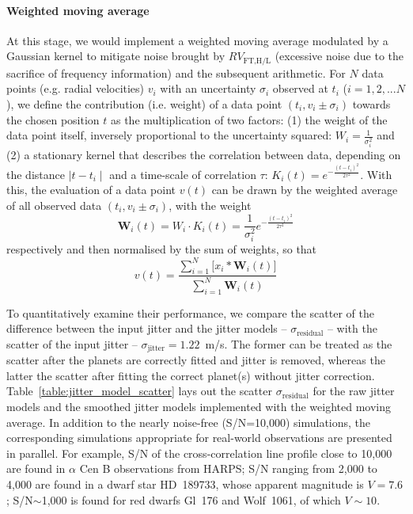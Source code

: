 \paragraph{Weighted moving average} At this stage, we would implement a weighted moving average modulated by a Gaussian kernel to mitigate noise brought by $RV_\text{FT,H/L}$ (excessive noise due to the sacrifice of frequency information) and the subsequent arithmetic. For $N$ data points (e.g. radial velocities) $v_i$ with an uncertainty $\sigma_i$ observed at $t_i$ ($i=1,2,...N$), we define the contribution (i.e. weight) of a data point $(t_i, v_i\pm \sigma_i)$ towards the chosen position $t$ as the multiplication of two factors: (1) the weight of the data point itself, inversely proportional to the uncertainty squared: $W_i= \frac{1}{\sigma_i^2}$ and (2) a stationary kernel that describes the correlation between data, depending on the distance $\mid t-t_i \mid$ and a time-scale of correlation $\tau$: $K_i(t) = e^{-\frac{(t-t_i)^2}{2\tau^2}}$. With this, the evaluation of a data point $v(t)$ can be drawn by the weighted average of all observed data $(t_i, v_i\pm \sigma_i)$, with the weight 
\begin{equation}
	\textbf{W}_i(t) = W_i \cdot K_i(t) = \frac{1}{\sigma_i^2} e^{-\frac{(t-t_i)^2}{2\tau^2}}
\end{equation}
respectively and then normalised by the sum of weights, so that 
\begin{equation}
	v(t) 	=  \frac{\sum\limits_{i=1}^{N} \bigg[x_i*\textbf{W}_i(t)\bigg]}{\sum\limits_{i=1}^{N} \textbf{W}_i(t)}
\end{equation}

To quantitatively examine their performance, we compare the scatter of the difference between the input jitter and the jitter models -- $\sigma_\text{residual}$ -- with the scatter of the input jitter -- $\sigma_\text{jitter} = 1.22$~m/s. The former can be treated as the scatter after the planets are correctly fitted and jitter is removed, whereas the latter the scatter after fitting the correct planet(s) without jitter correction. Table~\ref{table:jitter_model_scatter} lays out the scatter $\sigma_\text{residual}$ for the raw jitter models and the smoothed jitter models implemented with the weighted moving average. In addition to the nearly noise-free (S/N=10,000) simulations, the corresponding simulations appropriate for real-world observations are presented in parallel. For example, S/N of the cross-correlation line profile close to 10,000 are found in $\alpha$ Cen B observations from HARPS; S/N ranging from 2,000 to 4,000 are found in a dwarf star HD~189733, whose apparent magnitude is $V=7.6$; S/N$\sim$1,000 is found for red dwarfs Gl~176 and Wolf~1061, of which $V\sim10$. 

